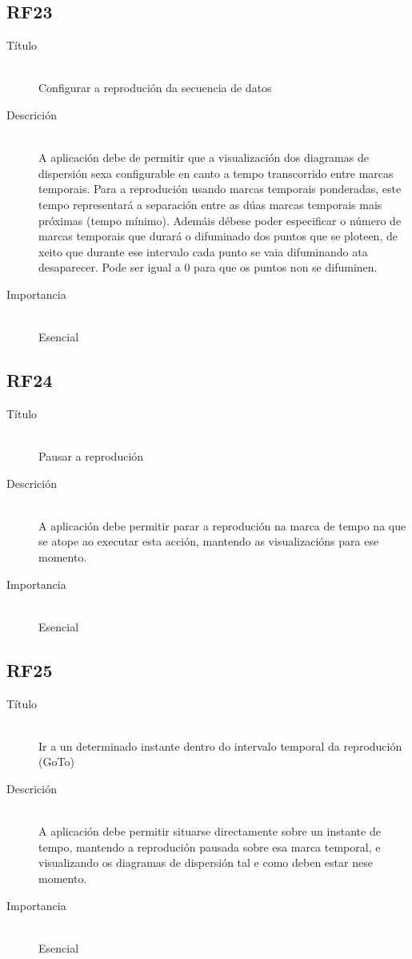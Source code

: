 \subsection*{RF23}
\begin{description}
\item[Título] \hfill \\
Configurar a reprodución da secuencia de datos
\item[Descrición] \hfill \\
A aplicación debe de permitir que a visualización dos diagramas de dispersión sexa configurable en canto a tempo transcorrido entre marcas temporais. Para a reprodución usando marcas temporais ponderadas, este tempo representará a separación entre as dúas marcas temporais mais próximas (tempo mínimo). Ademáis débese poder especificar o número de marcas temporais que durará o difuminado dos puntos que se ploteen, de xeito que durante ese intervalo cada punto se vaia difuminando ata desaparecer. Pode ser igual a 0 para que os puntos non se difuminen.
\item[Importancia] \hfill \\
Esencial
\end{description}

\subsection*{RF24}
\begin{description}
\item[Título] \hfill \\
Pausar a reprodución
\item[Descrición] \hfill \\
A aplicación debe permitir parar a reprodución na marca de tempo na que se atope ao executar esta acción, mantendo as visualizacións para ese momento.
\item[Importancia] \hfill \\
Esencial
\end{description}

\subsection*{RF25}
\begin{description}
\item[Título] \hfill \\
Ir a un determinado instante dentro do intervalo temporal da reprodución (GoTo)
\item[Descrición] \hfill \\
A aplicación debe permitir situarse directamente sobre un instante de tempo, mantendo a reprodución pausada sobre esa marca temporal, e visualizando os diagramas de dispersión tal e como deben estar nese momento.
\item[Importancia] \hfill \\
Esencial
\end{description}

